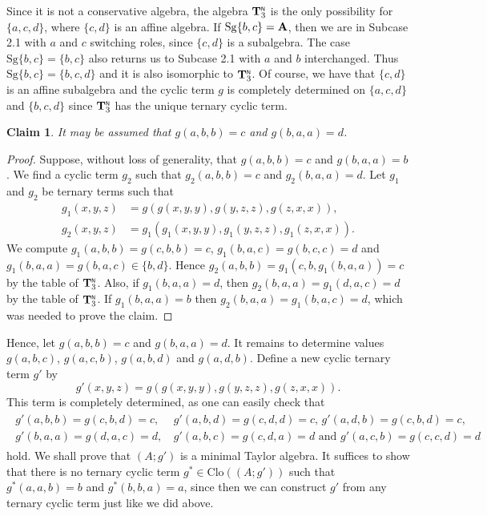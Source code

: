 \documentclass[11pt]{amsart}
\newcommand{\m}[1]{\mathbf{\uppercase{#1}}}
\newcommand{\n}{\scriptscriptstyle{\mathsf{N}}}
\theoremstyle{definition}
\theoremstyle{remark}
\theoremstyle{plain}
\newtheorem{claim}[thm]{Claim}
\begin{document}
\begin{enumerate}[wide, labelindent=0pt]
\begin{enumerate}[wide, labelindent=0pt]
    Since it is not a conservative algebra, the algebra $\m t_3^{\n}$ is the only possibility for $\{a,c,d\}$, where $\{c,d\}$ is an affine algebra. If  $\mathrm{Sg}\{b,c\}=\m a$, then we are in Subcase 2.1 with $a$ and $c$ switching roles, since $\{c,d\}$ is a subalgebra. The case  $\mathrm{Sg}\{b,c\}=\{b,c\}$ also returns us to Subcase 2.1 with $a$ and $b$ interchanged. Thus $\mathrm{Sg}\{b,c\}=\{b,c,d\}$ and it is also isomorphic to $\m t_3^{\n}$. Of course, we have that $\{c,d\}$ is an affine subalgebra and the cyclic term $g$ is completely determined on $\{a,c,d\}$ and $\{b,c,d\}$ since $\m t_3^{\n}$ has the unique ternary cyclic term.
    \begin{claim}
    It may be assumed that $g(a,b,b)=c$ and $g(b,a,a)=d$.
    \end{claim}
    \begin{proof}
    Suppose, without loss of generality, that $g(a,b,b)=c$ and $g(b,a,a)=b$. We find a cyclic term $g_2$ such that $g_2(a,b,b)=c$ and $g_2(b,a,a)=d$. Let $g_1$ and $g_2$ be ternary terms such that
    \begin{align*}
        g_1(x,y,z)&=g(g(x,y,y),g(y,z,z),g(z,x,x)),\\
        g_2(x,y,z)&=g_1(g_1(x,y,y),g_1(y,z,z),g_1(z,x,x)).
    \end{align*}
    We compute $g_1(a,b,b)=g(c,b,b)=c$, $g_1(b,a,c)=g(b,c,c)=d$ and $g_1(b,a,a)=g(b,a,c)\in \{b,d\}$. Hence $g_2(a,b,b)=g_1(c,b,g_1(b,a,a))=c$ by the table of $\m t_3^{\n}$. Also, if $g_1(b,a,a)=d$, then $g_2(b,a,a)=g_1(d,a,c)=d$  by the table of $\m t_3^{\n}$. If $g_1(b,a,a)=b$ then $g_2(b,a,a)=g_1(b,a,c)=d$, which was needed to prove the claim.
    \end{proof}
    Hence, let $g(a,b,b)=c$ and $g(b,a,a)=d$. It remains to determine values $g(a,b,c)$, $g(a,c,b)$, $g(a,b,d)$ and $g(a,d,b)$. Define a new cyclic ternary term $g'$ by 
    \[
    g'(x,y,z)=g(g(x,y,y),g(y,z,z),g(z,x,x)).
    \]
    This term is completely determined, as one can easily check that 
    \begin{gather}\label{mtat11}
    \begin{aligned}
        g'(a,b,b)=g(c,b,d)=c,\,& g'(a,b,d)=g(c,d,d)=c,\,g'(a,d,b)=g(c,b,d)=c,\\
        g'(b,a,a)=g(d,a,c)=d,\,& g'(a,b,c)=g(c,d,a)=d\text{ and }g'(a,c,b)=g(c,c,d)=d
    \end{aligned}
    \end{gather}
    hold. We shall prove that $(A;g')$ is a minimal Taylor algebra. It suffices to show that there is no ternary cyclic term $g^*\in\mathrm{Clo}((A;g'))$ such that $g^*(a,a,b)=b$ and $g^*(b,b,a)=a$, since then we can construct $g'$ from any ternary cyclic term just like we did above.


\end{enumerate}
\end{enumerate}
\end{document}
